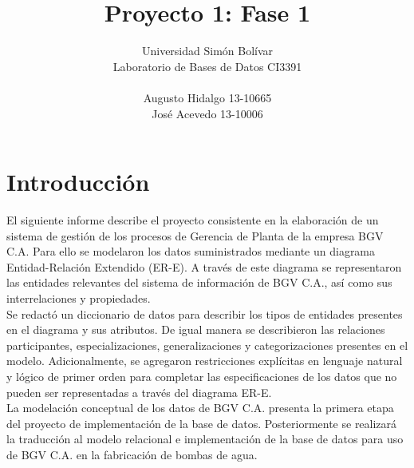 \documentclass[]{report}
\title{\Huge\bfseries Proyecto 1: Fase 1}
\author{\Large Universidad Simón Bolívar\\Laboratorio de Bases de Datos CI3391\\ \\Augusto Hidalgo 13-10665\\José Acevedo 13-10006}
\begin{document}
	\maketitle
	
	\chapter*{Introducción}
	\begin{adjustwidth}{16pt}{16pt}\large
		
		\hspace{1.5em}El siguiente informe describe el proyecto consistente en la elaboración de un sistema de gestión de los procesos de Gerencia de Planta de la empresa BGV C.A. Para ello se modelaron los datos suministrados mediante un diagrama Entidad-Relación Extendido (ER-E). A través de este diagrama se representaron las entidades relevantes
		del sistema de información de BGV C.A., así como sus interrelaciones y propiedades. \\
		
		Se redactó un diccionario de datos para describir los tipos de entidades presentes en el diagrama y sus atributos. De igual manera se describieron las relaciones participantes, especializaciones, generalizaciones y categorizaciones presentes en el modelo. Adicionalmente, se agregaron restricciones explícitas en lenguaje natural y lógico de primer orden para completar las especificaciones de los datos que no pueden ser representadas a través del diagrama ER-E.\\
		
		La modelación conceptual de los datos de BGV C.A. presenta la primera etapa del proyecto de implementación de la base de datos. Posteriormente se realizará la traducción al modelo relacional e implementación de la base de datos para uso de BGV C.A. en la fabricación de bombas de agua.
		
	
\end{adjustwidth}
	
\end{document}
